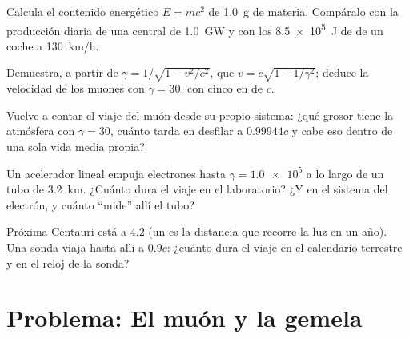 \begin{exercise}[$\star\star$]\label{exo:g12:special-relativity:11}
Calcula el contenido energético $E = mc^2$ de \qty{1.0}{g} de materia. Compáralo con
la producción diaria de una central de \qty{1.0}{GW} y con los \qty{8.5e5}{J} de
 de un coche a \qty{130}{km/h}.
\end{exercise}

\begin{exercise}[$\star\star\star$]\label{exo:g12:special-relativity:12}
Demuestra, a partir de $\gamma = 1/\sqrt{1 - v^2/c^2}$, que
$v = c\sqrt{1 - 1/\gamma^2}$; deduce la velocidad de los muones con $\gamma = 30$, con
cinco  en  de $c$.
\end{exercise}

\begin{exercise}[$\star\star\star$]\label{exo:g12:special-relativity:13}
Vuelve a contar el viaje del muón desde su propio sistema: ¿qué grosor tiene la
atmósfera con $\gamma = 30$, cuánto tarda en desfilar a $0.99944c$ y cabe eso dentro
de una sola vida media propia?
\end{exercise}

\begin{exercise}[$\star\star\star$]\label{exo:g12:special-relativity:14}
Un acelerador lineal empuja electrones hasta $\gamma = \num{1.0e5}$ a lo largo de un
tubo de \qty{3.2}{km}. ¿Cuánto dura el viaje en el laboratorio? ¿Y en el sistema del
electrón, y cuánto ``mide'' allí el tubo?
\end{exercise}

\begin{exercise}[$\star\star\star$]\label{exo:g12:special-relativity:15}
Próxima Centauri está a $4.2$  (un  es la distancia que recorre la luz
en un año). Una sonda viaja hasta allí a $0.9c$: ¿cuánto dura el viaje en el
calendario terrestre y en el reloj de la sonda?
\end{exercise}

\section{Problema: El muón y la gemela}

